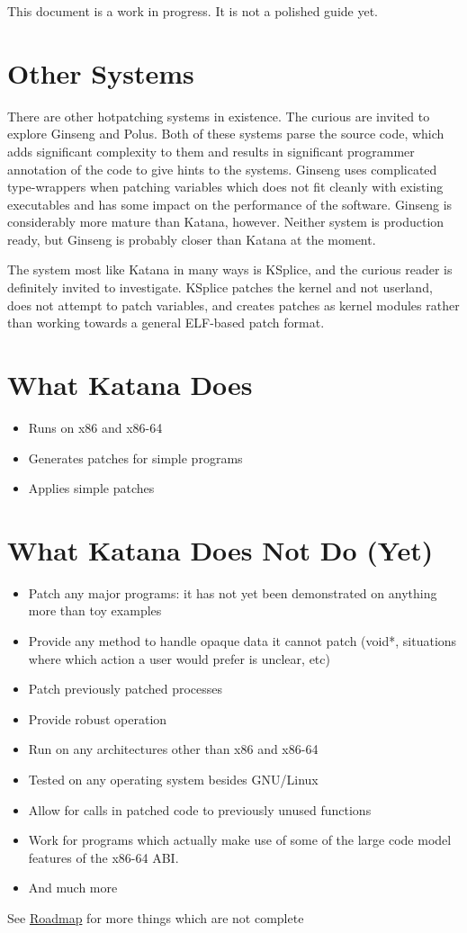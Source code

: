 \documentclass[11pt]{article}
\begin{document}
  This document is a work in progress. It is not a polished guide yet.
\section{Other Systems}
\label{sec-2}

  There are other hotpatching systems in existence. The curious are
  invited to explore Ginseng and Polus. Both of these systems parse
  the source code, which adds significant complexity to them and
  results in significant programmer annotation of the code to give
  hints to the systems. Ginseng uses complicated type-wrappers
  when patching variables which does not fit cleanly with existing
  executables and has some impact on the performance of the
  software. Ginseng is considerably more mature than Katana,
  however. Neither system is production ready, but Ginseng is probably
  closer than Katana at the moment.

  The system most like Katana in many ways is KSplice, and the curious
  reader is definitely invited to investigate. KSplice patches the
  kernel and not userland, does not attempt to patch variables, and
  creates patches as kernel modules rather than working towards a
  general ELF-based patch format.
\section{What Katana Does}
\label{sec-3}

\begin{itemize}
\item Runs on x86 and x86-64
\item Generates patches for simple programs
\item Applies simple patches
\end{itemize}
\section{What Katana Does Not Do (Yet)}
\label{sec-4}

\begin{itemize}
\item Patch any major programs: it has not yet been demonstrated on
    anything more than toy examples
\item Provide any method to handle opaque data it cannot patch (void*,
    situations where which action a user would prefer is unclear, etc)
\item Patch previously patched processes
\item Provide robust operation
\item Run on any architectures other than x86 and x86-64
\item Tested on any operating system besides GNU/Linux
\item Allow for calls in patched code to previously unused functions
\item Work for programs which actually make use of some of the large
    code model features of the x86-64 ABI.
\item And much more
\end{itemize}
  See \hyperref[sec-10]{Roadmap} for more things which are not complete
\end{document}
